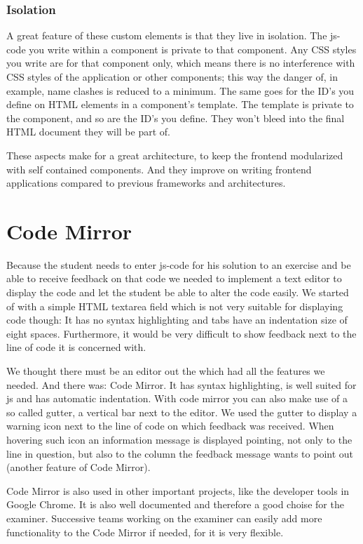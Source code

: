 \subsubsection{Isolation}
A great feature of these custom elements is that they live in isolation.
The \gls{js-code} you write within a component is private to that component.
Any CSS styles you write are for that component only,
which means there is no interference with CSS styles of the application
or other components; this way the danger of, in example, name clashes is 
reduced to a minimum.
The same goes for the ID's you define
on HTML elements in a component's template.
The template is private to the component, and so are the ID's you define.
They won't bleed into the final HTML document they will be part of.

These aspects make for a great architecture,
to keep the frontend modularized with self contained components.
And they improve on writing frontend applications
compared to previous frameworks and architectures.

\section{Code Mirror}
Because the \gls{student} needs to enter \gls{js-code}
for his solution to an exercise
and be able to receive feedback on that code
we needed to implement a text editor to display the code
and let the \gls{student} be able to alter the code easily.
We started of with a simple HTML textarea field
which is not very suitable for displaying code though:
It has no syntax highlighting
and tabs have an indentation size of eight spaces.
Furthermore, it would be very difficult to show feedback
next to the line of code it is concerned with.

We thought there must be an editor out the which had all the features we needed.
And there was: Code Mirror.
It has syntax highlighting,
is well suited for \gls{js}
and has automatic indentation.
With code mirror you can also make use of a so called gutter,
a vertical bar next to the editor.
We used the gutter to display a warning icon next to the line of code
on which feedback was received.
When hovering such icon an information message is displayed
pointing, not only to the line in question,
but also to the column the feedback message wants to point out
(another feature of Code Mirror).

Code Mirror is also used in other important projects,
like the developer tools in Google Chrome.
It is also well documented and therefore a good choise for the \gls{examiner}.
Successive teams working on the \gls{examiner}
can easily add more functionality to the Code Mirror if needed,
for it is very flexible.
